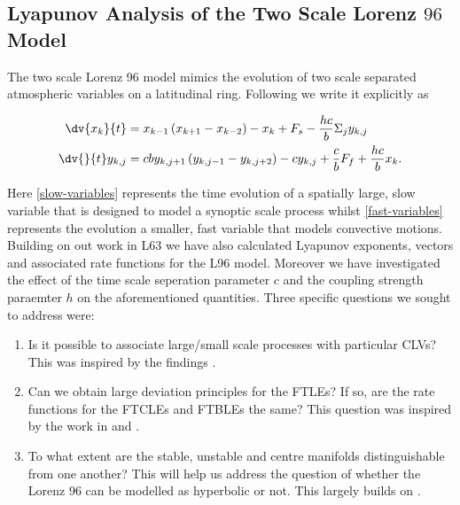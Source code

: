 \subsection{Lyapunov Analysis of the Two Scale Lorenz $96$ Model} \label{subsection: L96 Results}

The two scale Lorenz 96 model mimics the evolution of two scale separated atmospheric variables on a latitudinal ring. Following \cite{Carlu2019} we write it explicitly as

\begin{align}
\dv{x_k}{t} &= x_{k-1} \left(x_{k+1} - x_{k-2} \right) -x_k + F_s - \frac{hc}{b} \Sigma_{j} y_{k, j} \label{slow-variables}\\
\dv{}{t} y_{k,j} &= cb y_{k, j+1} \left(y_{k, j-1} - y_{k, j + 2} \right) - c y_{k, j} + \frac{c}{b} F_f + \frac{hc}{b} x_k. \label{fast-variables}
\end{align}

Here \ref{slow-variables} represents the time evolution of a spatially large, slow variable that is designed to model a synoptic scale process whilst \ref{fast-variables} represents the evolution a smaller, fast variable that models convective motions.\\

Building on out work in L63 we have also calculated Lyapunov exponents, vectors and associated rate functions for the L96 model. Moreover we have investigated the effect of the time scale seperation parameter $c$ and the coupling strength paraemter $h$ on the aforementioned quantities. Three specific questions we sought to address were:

\begin{enumerate}
    \item Is it possible to associate large/small scale processes with particular CLVs? This was inspired by the findings \cite{Vannitsem2016}. \label{question: scale}
    \item Can we obtain large deviation principles for the FTLEs? If so, are the rate functions for the FTCLEs and FTBLEs the same? This question was inspired by the work in \cite{Vannitsem2016} and \cite{DeCruz2018}. \label{question: l96-LDP}
    \item To what extent are the stable, unstable and centre manifolds distinguishable from one another? This will help us address the question of whether the Lorenz $96$ can be modelled as hyperbolic or not. This largely builds on \cite{Carlu2019} \label{question: L96-hyperbolic}.
\end{enumerate}

